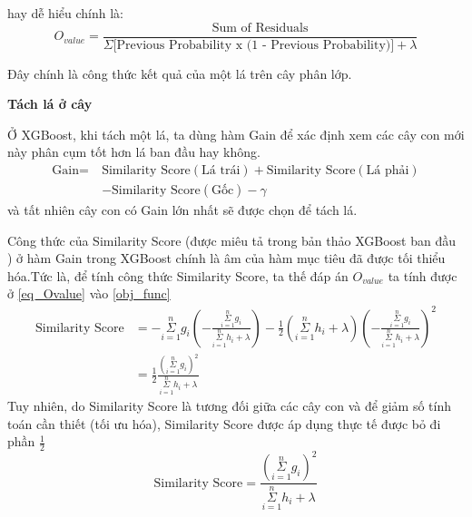     hay dễ hiểu chính là: \cite{starmer_2020_XGB}
    \begin{equation}
        O_{value} = \frac{\text{Sum of Residuals}}
        {\Sigma\text{[Previous Probability x (1 - Previous Probability)]} + \lambda}
    \end{equation}
    
    Đây chính là công thức kết quả của một lá trên cây phân lớp.
    
    \bigbreak
    
    \textbf{Tách lá ở cây}
    
    Ở XGBoost, khi tách một lá, ta dùng hàm Gain để xác định xem các cây con mới này phân cụm tốt hơn lá ban đầu hay không.
    \begin{equation} \label{eq_XBG_gain}
        \begin{split}
        \text{Gain} = \: & \text{Similarity Score}(\text{Lá trái}) 
        + \text{Similarity Score}(\text{Lá phải}) \\
        & - \text{Similarity Score}(\text{Gốc}) - \gamma
        \end{split}
    \end{equation}
    và tất nhiên cây con có Gain lớn nhất sẽ được chọn để tách lá.
    
    Công thức của Similarity Score (được miêu tả trong bản thảo XGBoost ban đầu \cite{chen2016xgboost}) ở hàm Gain trong XGBoost chính là âm của hàm mục tiêu đã được tối thiểu hóa.Tức là, để tính công thức Similarity Score, ta thế đáp án $O_{value}$ ta tính được ở \eqref{eq_Ovalue} vào \eqref{obj_func}
    \begin{equation}
        \begin{split}
        \text{Similarity Score} & = - \underset{i=1}{\overset{n}{\Sigma}} g_{i} (- \frac{\underset{i=1}{\overset{n}{\Sigma}} g_{i}} {\underset{i=1}{\overset{n}{\Sigma}}h_{i} + \lambda})
         - \frac{1}{2} (\underset{i=1}{\overset{n}{\Sigma}} h_{i} + \lambda) (- \frac{\underset{i=1}{\overset{n}{\Sigma}} g_{i}} {\underset{i=1}{\overset{n}{\Sigma}}h_{i} + \lambda})^2
        \\
        & = \frac{1}{2} \frac{(\underset{i=1}{\overset{n}{\Sigma}} g_{i})^2} {\underset{i=1}{\overset{n}{\Sigma}} h_{i} + \lambda}
        \end{split}
    \end{equation}
    Tuy nhiên, do Similarity Score là tương đối giữa các cây con và để giảm số tính toán cần thiết (tối ưu hóa), Similarity Score được áp dụng thực tế được bỏ đi phần $\frac{1}{2}$
    \begin{equation} \label{eq_XGB_sim}
        \text{Similarity Score} =  \frac{(\underset{i=1}{\overset{n}{\Sigma}} g_{i})^2} {\underset{i=1}{\overset{n}{\Sigma}} h_{i} + \lambda}
    \end{equation}
    
